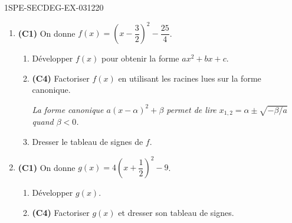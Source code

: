 \begin{exercice}{1SPE-SECDEG-EX-031}{2}{20}
\begin{enumerate}
  \item \textbf{(C1)} On donne $f(x) = \left(x - \dfrac{3}{2}\right)^{\!2} - \dfrac{25}{4}$.
  \begin{enumerate}
    \item Développer $f(x)$ pour obtenir la forme $ax^2 + bx + c$.
    \item \textbf{(C4)} Factoriser $f(x)$ en utilisant les racines lues sur la forme canonique.

    \textit{La forme canonique $a(x-\alpha)^2 + \beta$ permet de lire $x_{1,2} = \alpha \pm \sqrt{-\beta/a}$ quand $\beta < 0$.}

    \item Dresser le tableau de signes de $f$.
  \end{enumerate}

  \item \textbf{(C1)} On donne $g(x) = 4\!\left(x + \dfrac{1}{2}\right)^{\!2} - 9$.
  \begin{enumerate}
    \item Développer $g(x)$.
    \item \textbf{(C4)} Factoriser $g(x)$ et dresser son tableau de signes.
  \end{enumerate}
\end{enumerate}
\end{exercice}
